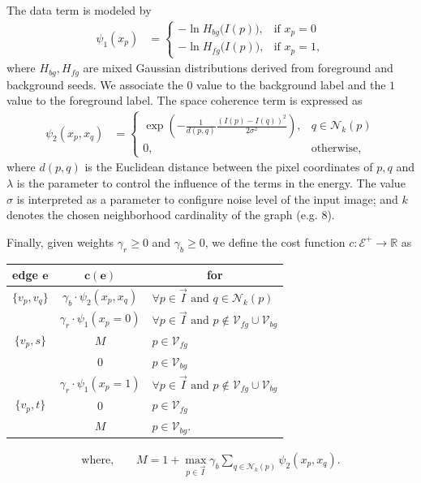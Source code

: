 The data term is modeled by
\begin{align*}
	\psi_1(x_p) &= \left\{ \begin{array}{ll}
	-\ln  H_{bg}\big( I(p) \big), & \text{if } x_p=0  \\[1em]	
	-\ln  H_{fg}\big( I(p) \big), & \text{if } x_p=1,
	\end{array}\right.
\end{align*}
where $H_{bg},H_{fg}$ are mixed Gaussian distributions derived from foreground and background seeds. We associate the $0$ value to the background label and the $1$ value to the foreground label. The space coherence term is expressed as
\begin{align*}
	\psi_{2}(x_p,x_q) &= \left\{ \begin{array}{ll}
	\displaystyle \exp{ \left(- \frac{1}{d(p,q)}\frac{(I(p) - I(q))^2}{2\sigma^2} \right) }, & q \in \mathcal{N}_k(p) \\[1em]
	0, & \text{otherwise},
	\end{array}\right.
\end{align*}
%
where $d(p,q)$ is the Euclidean distance between the pixel coordinates of $p,q$ and $\lambda$ is the parameter to control the influence of the terms in the energy. The value $\sigma$ is interpreted as a parameter to configure noise level of the input image; and $k$ denotes the chosen neighborhood cardinality of the graph (e.g. $8$).

Finally, given weights $\gamma_r \geq 0$ and $\gamma_b \geq 0$, we define the cost function $c:\mathcal{E}^+\rightarrow \mathbb{R}$ as

\begin{table}[h]
\center
\setlength{\extrarowheight}{0.75em}
\begin{tabular}{|c|c|l|}	
\hline
	\multicolumn{1}{|c|}{\textbf{edge} $\mathbf{e}$} & \multicolumn{1}{c|}{$\mathbf{c(e)}$} & \multicolumn{1}{c|}{\textbf{for}}\\
	\hline
	$\{v_p,v_q\}$ & $\gamma_b \cdot \psi_{2}(x_p,x_q)$ & $\forall p \in \vec{I} \text{ and } q \in \mathcal{N}_k(p)$\\
	\hline
	\multirow{3}{*}{ $\{v_p,s\}$ } & $\gamma_r \cdot \psi_1(x_p=0)$ & $\forall p \in \vec{I} \text{ and } p \notin \mathcal{V}_{fg} \cup \mathcal{V}_{bg}$\\
	& $M$ & $p \in \mathcal{V}_{fg}$ \\
	& $0$ & $p \in \mathcal{V}_{bg}$\\
	\hline
	\multirow{3}{*}{ $\{v_p,t\}$ } & $\gamma_r \cdot \psi_1(x_p=1)$ & $\forall p \in \vec{I} \text{ and } p \notin \mathcal{V}_{fg} \cup \mathcal{V}_{bg}$\\
	& $0$ & $p \in \mathcal{V}_{fg}$ \\
	& $M$ & $p \in \mathcal{V}_{bg}$. \\
	\hline
\end{tabular}
\begin{align*}
\text{where,} \qquad M = 1 + \max_{p \in \vec{I}}{\gamma_b \sum_{q \in \mathcal{N}_k(p)}}{\psi_2(x_p,x_q)}.
\end{align*}
\end{table}

